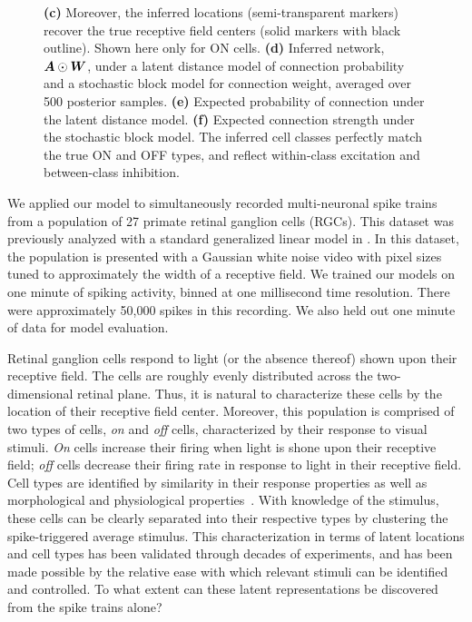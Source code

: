 \begin{figure}[t!]
{    \textbf{(c)} Moreover, the inferred locations (semi-transparent markers) recover the true receptive field centers (solid markers with black outline). Shown here only for ON cells.
    \textbf{(d)} Inferred network,~${\boldsymbol{A} \odot \boldsymbol{W}}$, under a latent distance model of connection probability and a stochastic block model for connection weight, averaged over 500 posterior samples.
    \textbf{(e)} Expected probability of connection under the latent distance model.
    \textbf{(f)} Expected connection strength under the stochastic block model. The inferred cell classes perfectly match the true ON and OFF types, and reflect within-class excitation and between-class inhibition.
}
  \label{fig:rgc}
\end{figure}

We applied our model to simultaneously recorded multi-neuronal spike
trains from a population of 27 primate retinal ganglion cells
(RGCs). This dataset was previously analyzed with a standard
generalized linear model in \citep{Pillow-2008}.  In this dataset, the
population is presented with a Gaussian white noise video with pixel
sizes tuned to approximately the width of a receptive field. We
trained our models on one minute of spiking activity, binned at one
millisecond time resolution. There were approximately 50,000 spikes in
this recording.  We also held out one minute of data for model
evaluation.

Retinal ganglion cells respond to light (or the absence thereof) shown
upon their receptive field. The cells are roughly evenly distributed
across the two-dimensional retinal plane. Thus, it is natural to
characterize these cells by the location of their receptive field
center.  Moreover, this population is comprised of two types of cells,
\textit{on} and \textit{off} cells, characterized by their response to
visual stimuli. \textit{On} cells increase their firing when light is
shone upon their receptive field; \textit{off} cells decrease their
firing rate in response to light in their receptive field.  Cell types
are identified by similarity in their response properties as well as
morphological and physiological properties~\citep{sanes2015types}. With
knowledge of the stimulus, these cells can be clearly separated into
their respective types by clustering the spike-triggered average
stimulus.  This characterization in terms of latent locations and cell
types has been validated through decades of experiments, and has been
made possible by the relative ease with which relevant stimuli can be
identified and controlled. To what extent can these latent
representations be discovered from the spike trains alone?

